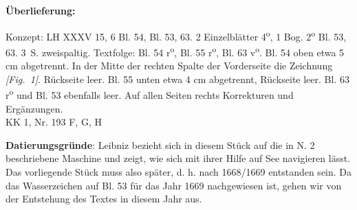       
               
                \begin{ledgroupsized}[r]{120mm}
                \footnotesize 
                \pstart                
                \noindent\textbf{\"{U}berlieferung:}   
                \pend
                \end{ledgroupsized}
            
              
                            \begin{ledgroupsized}[r]{114mm}
                            \footnotesize 
                            \pstart \parindent -6mm
                            Konzept: LH XXXV 15, 6 Bl. 54, Bl. 53, 63. 2 Einzelbl\"{a}tter 4\textsuperscript{o}, 1 Bog. 2\textsuperscript{o} Bl. 53, 63. 3~S. zweispaltig. Textfolge: Bl. 54 r\textsuperscript{o}, Bl. 55 r\textsuperscript{o}, Bl. 63 v\textsuperscript{o}. Bl. 54 oben etwa 5 cm abgetrennt. In der Mitte der rechten Spalte der Vorderseite die Zeichnung \textit{[Fig.~1]}. R\"{u}ckseite leer. Bl. 55 unten etwa 4 cm abgetrennt, R\"{u}ckseite leer. Bl. 63 r\textsuperscript{o} und Bl. 53 ebenfalls leer. Auf allen Seiten rechts Korrekturen und Erg\"{a}nzungen.\\KK 1, Nr. 193 F, G, H \pend
                            \end{ledgroupsized}
                \vspace*{5mm}
                \begin{ledgroup}
                \footnotesize 
                \pstart
            \noindent\footnotesize{\textbf{Datierungsgr\"{u}nde}: Leibniz bezieht sich in diesem St\"{u}ck auf die in N. 2\protect{} beschriebene Maschine und zeigt, wie sich mit ihrer Hilfe auf See navigieren l\"{a}sst. Das vorliegende St\"{u}ck muss also sp\"{a}ter, d. h. nach 1668/1669 entstanden sein. Da das Wasserzeichen auf Bl. 53 f\"{u}r das Jahr 1669 nachgewiesen ist, gehen wir von der Entstehung des Textes in diesem Jahr aus.}
                \pend
                \end{ledgroup}
            
